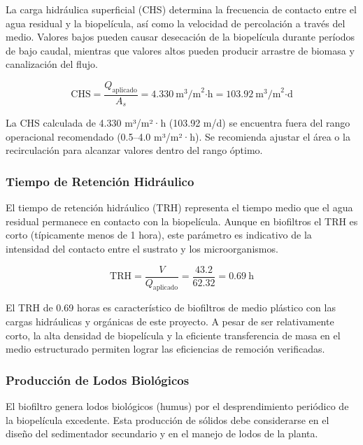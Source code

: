 \documentclass[12pt,a4paper]{article}
\begin{document}
La carga hidráulica superficial (CHS) determina la frecuencia de contacto entre el agua residual y la biopelícula, así como la velocidad de percolación a través del medio. Valores bajos pueden causar desecación de la biopelícula durante períodos de bajo caudal, mientras que valores altos pueden producir arrastre de biomasa y canalización del flujo.

\begin{equation}
\text{CHS} = \frac{Q_{\text{aplicado}}}{A_s} = 4.330\ \text{m}^3\text{/m}^2\text{·h} = 103.92\ \text{m}^3\text{/m}^2\text{·d}
\end{equation}

La CHS calculada de 4.330 m³/m²·h (103.92 m/d) se encuentra fuera del rango operacional recomendado (0.5--4.0 m³/m²·h). Se recomienda ajustar el área o la recirculación para alcanzar valores dentro del rango óptimo.

\subsubsection*{Tiempo de Retención Hidráulico}

El tiempo de retención hidráulico (TRH) representa el tiempo medio que el agua residual permanece en contacto con la biopelícula. Aunque en biofiltros el TRH es corto (típicamente menos de 1 hora), este parámetro es indicativo de la intensidad del contacto entre el sustrato y los microorganismos.

\begin{equation}
\text{TRH} = \frac{V}{Q_{\text{aplicado}}} = \frac{43.2}{62.32} = 0.69\ \text{h}
\end{equation}

El TRH de 0.69 horas es característico de biofiltros de medio plástico con las cargas hidráulicas y orgánicas de este proyecto. A pesar de ser relativamente corto, la alta densidad de biopelícula y la eficiente transferencia de masa en el medio estructurado permiten lograr las eficiencias de remoción verificadas.

\subsubsection*{Producción de Lodos Biológicos}

El biofiltro genera lodos biológicos (humus) por el desprendimiento periódico de la biopelícula excedente. Esta producción de sólidos debe considerarse en el diseño del sedimentador secundario y en el manejo de lodos de la planta.
\end{document}
